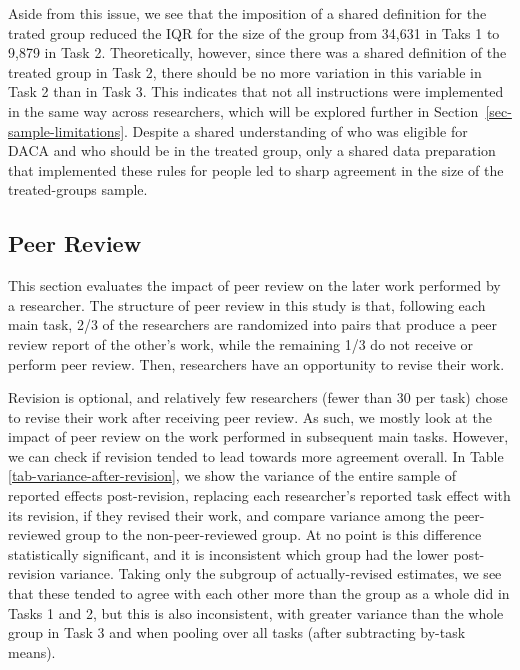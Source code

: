 \documentclass[
  letterpaper,
  DIV=11,
  numbers=noendperiod]{scrartcl}
\begin{document}
Aside from this issue, we see that the imposition of a shared definition
for the trated group reduced the IQR for the size of the group from
34,631 in Taks 1 to 9,879 in Task 2. Theoretically, however, since there
was a shared definition of the treated group in Task 2, there should be
no more variation in this variable in Task 2 than in Task 3. This
indicates that not all instructions were implemented in the same way
across researchers, which will be explored further in
Section~\ref{sec-sample-limitations}. Despite a shared understanding of
who was eligible for DACA and who should be in the treated group, only a
shared data preparation that implemented these rules for people led to
sharp agreement in the size of the treated-groups sample.

\hypertarget{peer-review}{%
\subsection{Peer Review}\label{peer-review}}

This section evaluates the impact of peer review on the later work
performed by a researcher. The structure of peer review in this study is
that, following each main task, 2/3 of the researchers are randomized
into pairs that produce a peer review report of the other's work, while
the remaining 1/3 do not receive or perform peer review. Then,
researchers have an opportunity to revise their work.

Revision is optional, and relatively few researchers (fewer than 30 per
task) chose to revise their work after receiving peer review. As such,
we mostly look at the impact of peer review on the work performed in
subsequent main tasks. However, we can check if revision tended to lead
towards more agreement overall. In Table
\ref{tab-variance-after-revision}, we show the variance of the entire
sample of reported effects post-revision, replacing each researcher's
reported task effect with its revision, if they revised their work, and
compare variance among the peer-reviewed group to the non-peer-reviewed
group. At no point is this difference statistically significant, and it
is inconsistent which group had the lower post-revision variance. Taking
only the subgroup of actually-revised estimates, we see that these
tended to agree with each other more than the group as a whole did in
Tasks 1 and 2, but this is also inconsistent, with greater variance than
the whole group in Task 3 and when pooling over all tasks (after
subtracting by-task means).
\end{document}

